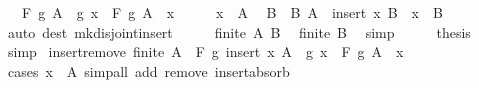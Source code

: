 \begin{isabellebody}
\ \ \ {\isachardoublequoteopen}F\ g\ A\ {\isacharequal}{\kern0pt}\ g\ x\ \isactrlbold {\isacharasterisk}{\kern0pt}\ F\ g\ {\isacharparenleft}{\kern0pt}A\ {\isacharminus}{\kern0pt}\ {\isacharbraceleft}{\kern0pt}x{\isacharbraceright}{\kern0pt}{\isacharparenright}{\kern0pt}{\isachardoublequoteclose}\isanewline
%
\isadelimproof
%
\endisadelimproof
%
\isatagproof
{}\isamarkupfalse%
\ {\isacharminus}{\kern0pt}\isanewline
\ \ \isamarkupfalse%
\ {\isacartoucheopen}x\ {\isasymin}\ A{\isacartoucheclose}\ \isamarkupfalse%
\ B\ \ B{\isacharcolon}{\kern0pt}\ {\isachardoublequoteopen}A\ {\isacharequal}{\kern0pt}\ insert\ x\ B{\isachardoublequoteclose}\ \ {\isachardoublequoteopen}x\ {\isasymnotin}\ B{\isachardoublequoteclose}\isanewline
\ \ \ \ \isamarkupfalse%
\ {\isacharparenleft}{\kern0pt}auto\ dest{\isacharcolon}{\kern0pt}\ mk{\isacharunderscore}{\kern0pt}disjoint{\isacharunderscore}{\kern0pt}insert{\isacharparenright}{\kern0pt}\isanewline
\ \ \isamarkupfalse%
\ \isamarkupfalse%
\ {\isacartoucheopen}finite\ A{\isacartoucheclose}\ B\ \isamarkupfalse%
\ {\isachardoublequoteopen}finite\ B{\isachardoublequoteclose}\ \isamarkupfalse%
\ simp\isanewline
\ \ \isamarkupfalse%
\ \isamarkupfalse%
\ {\isacharquery}{\kern0pt}thesis\ \isamarkupfalse%
\ simp\isanewline
{}\isamarkupfalse%
%
\endisatagproof
{\isafoldproof}%
%
\isadelimproof
\isanewline
%
\endisadelimproof
\isanewline
{}\isamarkupfalse%
\ insert{\isacharunderscore}{\kern0pt}remove{\isacharcolon}{\kern0pt}\ {\isachardoublequoteopen}finite\ A\ {\isasymLongrightarrow}\ F\ g\ {\isacharparenleft}{\kern0pt}insert\ x\ A{\isacharparenright}{\kern0pt}\ {\isacharequal}{\kern0pt}\ g\ x\ \isactrlbold {\isacharasterisk}{\kern0pt}\ F\ g\ {\isacharparenleft}{\kern0pt}A\ {\isacharminus}{\kern0pt}\ {\isacharbraceleft}{\kern0pt}x{\isacharbraceright}{\kern0pt}{\isacharparenright}{\kern0pt}{\isachardoublequoteclose}\isanewline
%
\isadelimproof
\ \ %
\endisadelimproof
%
\isatagproof
{}\isamarkupfalse%
\ {\isacharparenleft}{\kern0pt}cases\ {\isachardoublequoteopen}x\ {\isasymin}\ A{\isachardoublequoteclose}{\isacharparenright}{\kern0pt}\ {\isacharparenleft}{\kern0pt}simp{\isacharunderscore}{\kern0pt}all\ add{\isacharcolon}{\kern0pt}\ remove\ insert{\isacharunderscore}{\kern0pt}absorb{\isacharparenright}{\kern0pt}%
\endisatagproof
{\isafoldproof}%
%
\isadelimproof

\end{isabellebody}
